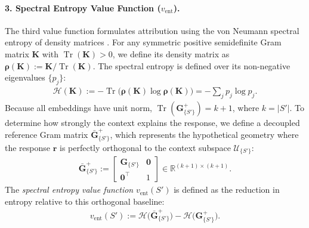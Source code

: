 \documentclass{article}
\begin{document}
\paragraph{3. Spectral Entropy Value Function ($v_{\text{ent}}$).}
The third value function formulates attribution using the von Neumann spectral entropy of density matrices \cite{friedman2022vendi}. For any symmetric positive semidefinite Gram matrix $\mathbf{K}$ with $\operatorname{Tr}(\mathbf{K}) > 0$, we define its density matrix as $\boldsymbol{\rho}(\mathbf{K}) := \mathbf{K} / \operatorname{Tr}(\mathbf{K})$. The spectral entropy is defined over its non-negative eigenvalues $\{p_j\}$:
\begin{align}
    \mathcal{H}(\mathbf{K}) := -\operatorname{Tr}\big(\boldsymbol{\rho}(\mathbf{K}) \log \boldsymbol{\rho}(\mathbf{K})\big) = -\sum_{j} p_j \log p_j.
\end{align}
Because all embeddings have unit norm, $\operatorname{Tr}(\mathbf{G}^{+}_{\{S'\}}) = k + 1$, where $k = |S'|$. To determine how strongly the context explains the response, we define a decoupled reference Gram matrix $\bar{\mathbf{G}}^{+}_{\{S'\}}$, which represents the hypothetical geometry where the response $\mathbf{r}$ is perfectly orthogonal to the context subspace $\mathcal{U}_{\{S'\}}$:
\begin{align}
    \bar{\mathbf{G}}^{+}_{\{S'\}} := \begin{bmatrix} 
        \mathbf{G}_{\{S'\}} & \mathbf{0} \\ 
        \mathbf{0}^\top & 1 
    \end{bmatrix} \in \mathbb{R}^{(k+1) \times (k+1)}.
\end{align}
The \emph{spectral entropy value function} $v_{\text{ent}}(S')$ is defined as the reduction in entropy relative to this orthogonal baseline:
\begin{align}\label{eq:v_ent}
    v_{\text{ent}}(S') := \mathcal{H}\big(\bar{\mathbf{G}}^{+}_{\{S'\}}\big) - \mathcal{H}\big(\mathbf{G}^{+}_{\{S'\}}\big).
\end{align}
\end{document}
